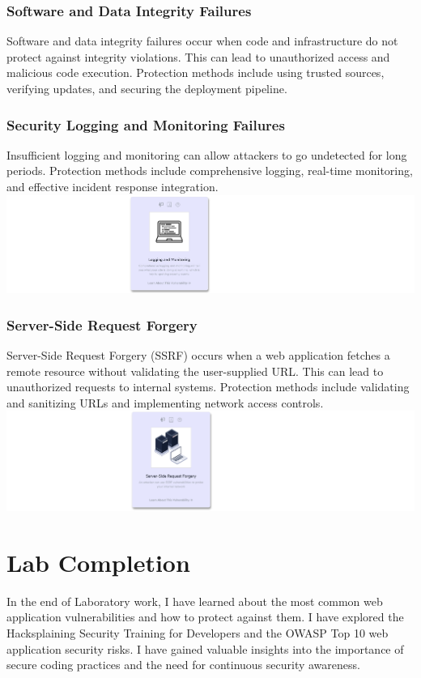 \documentclass[12pt]{article}
\begin{document}
\subsubsection{Software and Data Integrity Failures}
Software and data integrity failures occur when code and infrastructure do not protect against integrity violations. This can lead to unauthorized access and malicious code execution. Protection methods include using trusted sources, verifying updates, and securing the deployment pipeline.

\newpage

\subsubsection{Security Logging and Monitoring Failures}
Insufficient logging and monitoring can allow attackers to go undetected for long periods. Protection methods include comprehensive logging, real-time monitoring, and effective incident response integration. \\
\includegraphics[width=1\textwidth]{Image13.png}

\subsubsection{Server-Side Request Forgery}
Server-Side Request Forgery (SSRF) occurs when a web application fetches a remote resource without validating the user-supplied URL. This can lead to unauthorized requests to internal systems. Protection methods include validating and sanitizing URLs and implementing network access controls. \\
\includegraphics[width=1\textwidth]{Image14.png}

\section{Lab Completion}

In the end of Laboratory work, I have learned about the most common web application vulnerabilities and how to protect against them. I have explored the Hacksplaining Security Training for Developers and the OWASP Top 10 web application security risks. I have gained valuable insights into the importance of secure coding practices and the need for continuous security awareness.
\end{document}
